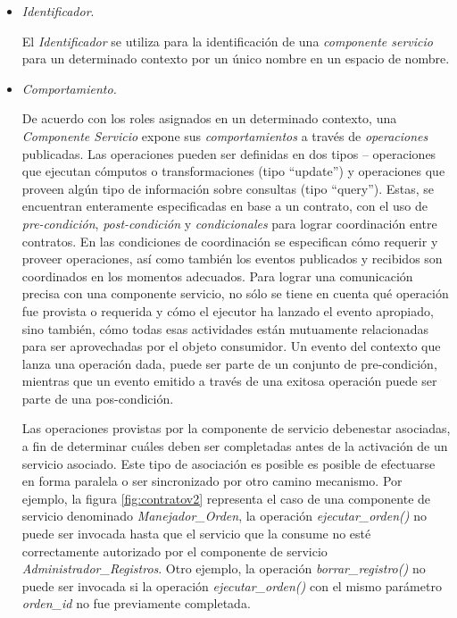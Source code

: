 \begin{itemize}

\item \textit{Identificador}.

El \textit{Identificador} se utiliza para la identificación de una \textit{componente servicio} para un determinado contexto por un único nombre en un espacio de nombre.

\item \textit{Comportamiento.}

De acuerdo con los roles asignados en un determinado contexto, una
\textit{Componente Servicio} expone sus  \textit{comportamientos} a través de \textit{operaciones} publicadas. Las operaciones pueden ser definidas en dos tipos – operaciones que ejecutan cómputos o
transformaciones (tipo “update”) y operaciones que proveen algún tipo de información
sobre consultas (tipo “query”). Estas, se encuentran enteramente especificadas en base
a un contrato, con el uso de \textit{pre-condición}, \textit{post-condición} y \textit{condicionales} para lograr coordinación entre contratos. En las condiciones de coordinación se especifican cómo
requerir y proveer operaciones, así como también los eventos publicados y recibidos son coordinados en los momentos adecuados. Para lograr una comunicación precisa con una componente servicio, no sólo se tiene en cuenta qué operación fue provista o requerida y cómo el ejecutor ha lanzado el evento apropiado, sino también, cómo todas esas actividades están mutuamente relacionadas para ser aprovechadas por el objeto consumidor. Un evento del contexto que lanza una operación dada, puede ser parte de un conjunto de pre-condición, mientras que un evento emitido a través de una exitosa operación puede ser parte de una pos-condición.


Las operaciones provistas por la componente de servicio debenestar asociadas, a fin de determinar cuáles deben ser completadas antes de la activación de un servicio asociado. Este tipo de asociación es posible es posible de efectuarse en forma paralela o ser sincronizado por otro camino mecanismo. Por ejemplo, la figura \ref{fig:contratov2} representa el caso de una componente de servicio denominado \textit{Manejador\_Orden}, la operación \textit{ejecutar\_orden()} no puede ser invocada hasta que el servicio que la consume no esté correctamente autorizado por el componente de servicio \textit{Administrador\_Registros}. Otro ejemplo, la operación \textit{borrar\_registro()} no puede ser invocada si la operación \textit{ejecutar\_orden()} con el mismo parámetro \textit{orden\_id} no fue previamente completada.





\end{itemize}
